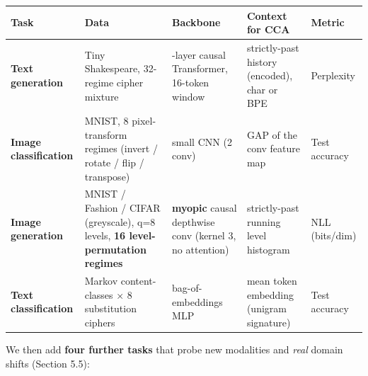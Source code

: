 \documentclass[
  11pt,
]{article}
\newcounter{none} %
\begin{document}
{\def\LTcaptype{none} %
\begin{longtable}[]{@{}
  >{\raggedright\arraybackslash}p{}
  >{\raggedright\arraybackslash}p{}
  >{\raggedright\arraybackslash}p{}
  >{\raggedright\arraybackslash}p{}
  >{\raggedright\arraybackslash}p{}@{}}
\toprule\noalign{}
\begin{minipage}[b]{\linewidth}\raggedright
Task
\end{minipage} & \begin{minipage}[b]{\linewidth}\raggedright
Data
\end{minipage} & \begin{minipage}[b]{\linewidth}\raggedright
Backbone
\end{minipage} & \begin{minipage}[b]{\linewidth}\raggedright
Context for CCA
\end{minipage} & \begin{minipage}[b]{\linewidth}\raggedright
Metric
\end{minipage} \\
\midrule\noalign{}
\endhead
\bottomrule\noalign{}
\endlastfoot
\textbf{Text generation} & Tiny Shakespeare, 32-regime cipher mixture &
3-layer causal Transformer, 16-token window & strictly-past history
(encoded), char or BPE & Perplexity \\
\textbf{Image classification} & MNIST, 8 pixel-transform regimes (invert
/ rotate / flip / transpose) & small CNN (2 conv) & GAP of the conv
feature map & Test accuracy \\
\textbf{Image generation} & MNIST / Fashion / CIFAR (greyscale), q=8
levels, \textbf{16 level-permutation regimes} & \textbf{myopic} causal
depthwise conv (kernel 3, no attention) & strictly-past running level
histogram & NLL (bits/dim) \\
\textbf{Text classification} & 4 Markov content-classes × 8 substitution
ciphers & bag-of-embeddings MLP & mean token embedding (unigram
signature) & Test accuracy \\
\end{longtable}
}

We then add \textbf{four further tasks} that probe new modalities and
\emph{real} domain shifts (Section 5.5):
\end{document}

